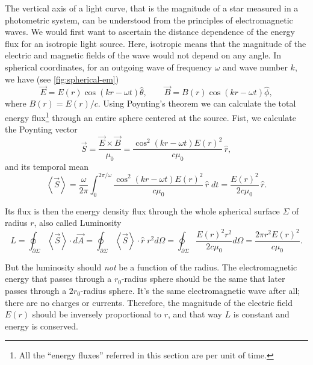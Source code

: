 	The vertical axis of a light curve, that is the magnitude of a star measured in a photometric system, can be understood from the principles of electromagnetic waves.
	We would first want to ascertain the distance dependence of the energy flux for an isotropic light source.
	Here, isotropic means that the magnitude of the electric and magnetic fields of the wave would not depend on any angle.
	In spherical coordinates, for an outgoing wave of frequency $\omega$ and wave number $k$, we have (see \autoref{fig:spherical-em})
	\begin{equation}
		\vec E = E(r) \cos(kr-\omega t) \hat\theta, \qquad \vec B = B(r) \cos(kr-\omega t) \hat\phi,
	\end{equation}
	where $B(r)=E(r)/c$. Using Poynting's theorem \citep[\S8.1.2]{Griffiths2013} we can calculate the total energy flux\footnote{All the \enquote{energy fluxes} referred in this section are per unit of time.} through an entire sphere centered at the source.
	Fist, we calculate the Poynting vector 
	\begin{equation}
		\vec S = \frac{\vec E \times \vec B}{\mu_0} = \frac{\cos^2(kr-\omega t)E(r)^2}{c\mu_0} \,\hat r,
	\end{equation}
	and its temporal mean 
	\begin{equation}
		\left<\vec S \right> = \frac{\omega}{2\pi}\int_0^{2\pi/\omega} \frac{\cos^2(kr-\omega t)E(r)^2}{c\mu_0} \,\hat r\;dt = \frac{E(r)^2}{2c\mu_0}\,\hat r. \label{eq:poynting}
	\end{equation}

	Its flux is then the energy density flux through the whole spherical surface $\Sigma$ of radius $r$, also called Luminosity
	\begin{equation}
		L = \oint_{\partial\Sigma} \left<\vec S\right> \cdot d\vec{A} 
			= \oint_{\partial\Sigma} \left<\vec S\right> \cdot \hat r \; r^2 d\Omega
			= \oint_{\partial\Sigma} \frac{E(r)^2 r^2}{2c\mu_0} d\Omega
			= \frac{2\pi r^2  E(r)^2}{c\mu_0}. \label{eq:luminosity}
	\end{equation}

	But the luminosity should \textit{not} be a function of the radius. 
	The electromagnetic energy that passes through a $r_0$-radius sphere should be the same that later passes through a $2r_0$-radius sphere.
	It's the same electromagnetic wave after all; there are no charges or currents. 
	Therefore, the magnitude of the electric field $E(r)$ should be inversely proportional to $r$, and that way $L$ is constant and energy is conserved.
	
